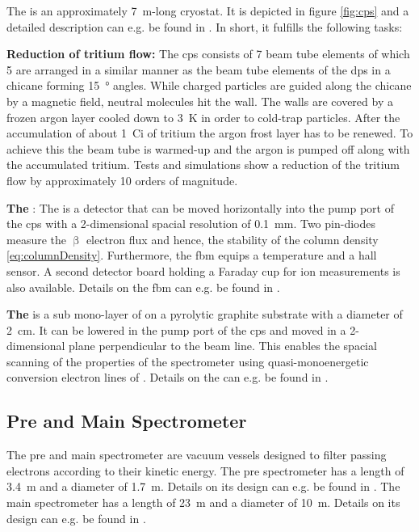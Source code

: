 The  is an approximately \SI{7}{m}-long cryostat. It is depicted in figure \ref{fig:cps} and a detailed description can e.g. be found in \cite{Jansen2015}. In short, it fulfills the following tasks:
{\par\textbf{Reduction of tritium flow:}
The \gls{cps} consists of 7 beam tube elements of which 5 are arranged in a similar manner as the beam tube elements of the \gls{dps} in a chicane forming \SI{15}{\degree} angles. While charged particles are guided along the chicane by a magnetic field, neutral molecules hit the wall. The walls are covered by a frozen argon layer cooled down to \SI{3}{K} in order to cold-trap particles. After the accumulation of about \SI{1}{Ci} of tritium the argon frost layer has to be renewed. To achieve this the beam tube is warmed-up and the argon is pumped off along with the accumulated tritium. Tests and simulations show a reduction of the tritium flow by approximately 10 orders of magnitude.}

{\par\textbf{The }: The  is a detector that can be moved horizontally into the pump port of the \gls{cps} with a 2-dimensional spacial resolution of \SI{0.1}{mm}. Two pin-diodes measure the $\upbeta$ electron flux and hence, the stability of the column density \eqref{eq:columnDensity}. Furthermore, the \gls{fbm} equips a temperature and a hall sensor. A second detector board holding a Faraday cup for ion measurements is also available. Details on the \gls{fbm} can e.g. be found in \cite{Ellinger2017}.}

{\par\textbf{The } is a sub mono-layer of \kryptonEightyThree{} on a pyrolytic graphite substrate with a diameter of \SI{2}{cm}. It can be lowered in the pump port of the \gls{cps} and moved in a 2-dimensional plane perpendicular to the beam line. This enables the spacial scanning of the properties of the spectrometer using quasi-monoenergetic conversion electron lines of \kryptonEightyThree. Details on the  can e.g. be found in \cite{Bauer2014}.}

\subsection{Pre and Main Spectrometer}
\label{sec:spectrometer}

The pre and main spectrometer are vacuum vessels designed to filter passing electrons according to their kinetic energy. The pre spectrometer has a length of \SI{3.4}{m} and a diameter of \SI{1.7}{m}. Details on its design can e.g. be found in \cite{Prall2012}. The main spectrometer has a length of \SI{23}{m} and a diameter of \SI{10}{m}. Details on its design can e.g. be found in \cite{Angrik:2005ep}.

